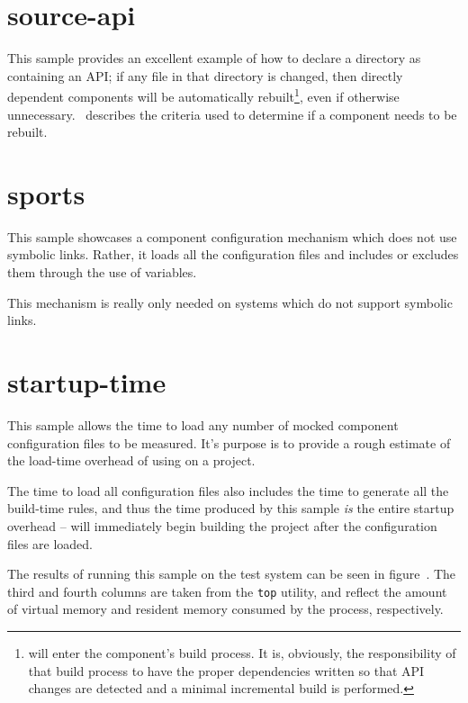 \section{source-api}

This sample provides an excellent example of how to declare a \destdir
directory as containing an API; if any file in that directory is
changed, then directly dependent components will be automatically
rebuilt\footnote{\lmsbw will enter the component's build process.  It
  is, obviously, the responsibility of that build process to have the
  proper dependencies written so that API changes are detected and a
  minimal incremental build is performed.}, even if otherwise
unnecessary.  ~describes the
criteria used to determine if a component needs to be rebuilt.

\section{sports}\label{samples:sports}

This sample showcases a component configuration mechanism which does
not use symbolic links.  Rather, it loads all the configuration files and
includes or excludes them through the use of \make variables.

This mechanism is really only needed on systems which do not support
symbolic links.

\section{startup-time}\label{samples:startup-time}

This sample allows the time to load any number of mocked component
configuration files to be measured. It's purpose is to provide a rough
estimate of the load-time overhead of using \lmsbw on a project.

The time to load all configuration files also includes the time to
generate all the build-time \make rules, and thus the time produced by
this sample \emph{is} the entire startup overhead -- \make will
immediately begin building the project after the configuration files
are loaded.

The results of running this sample on the test system can be seen in
figure~.  The third and fourth
columns are taken from the \texttt{top} utility, and reflect the
amount of virtual memory and resident memory consumed by the process,
respectively.

